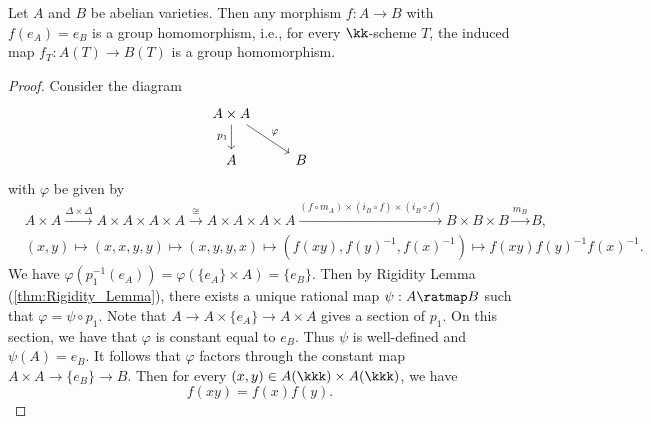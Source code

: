 
    \begin{theorem}\label{thm: structure of morphism between abelian varieties}
        Let \(A\) and \(B\) be abelian varieties. 
        Then any morphism \(f: A \to B\) with \(f(e_A) = e_B\) is a group homomorphism, i.e., for every \(\kk\)-scheme \(T\), the induced map \(f_T: A(T) \to B(T)\) is a group homomorphism.
    \end{theorem}
    \begin{proof}
        Consider the diagram
        \[ \begin{tikzcd}
            A \times A \arrow[rd, "\varphi"] \arrow[d, "p_1"'] &  \\
            A  & B
        \end{tikzcd} \]
        with \(\varphi\) be given by
        \begin{align*}
            & A \times A \xrightarrow{\Delta \times \Delta} A \times A \times A \times A \xrightarrow{\cong} A \times A \times A \times A \xrightarrow{(f \circ m_A) \times (i_B \circ f) \times (i_B \circ f)} B \times B \times B \xrightarrow{m_B} B, \\
            & (x,y) \mapsto (x,x,y,y) \mapsto (x,y,y,x) \mapsto (f(xy), f(y)^{-1}, f(x)^{-1}) \mapsto f(xy) f(y)^{-1} f(x)^{-1}.
        \end{align*} 
        We have \(\varphi(p_1^{-1}(e_A)) = \varphi(\{e_A\} \times A) = \{e_B\}\).
        Then by Rigidity Lemma (\cref{thm:Rigidity_Lemma}), there exists a unique rational map \(\psi: A \ratmap B\) such that \(\varphi = \psi \circ p_1\).
        Note that \(A \to A \times \{e_A\} \to A \times A\) gives a section of \(p_1\).
        On this section, we have that \(\varphi\) is constant equal to \(e_B\).
        Thus \(\psi\) is well-defined and \(\psi(A) = e_B\).
        It follows that \(\varphi\) factors through the constant map \(A \times A \to \{e_B\} \to B\).
        Then for every \((x,y) \in A(\kkk) \times A(\kkk)\), we have
        \[ f(xy) = f(x) f(y). \]
    \end{proof}

